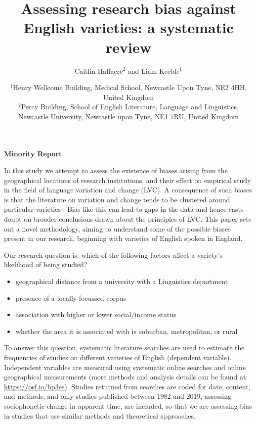 \documentclass[12pt,a4paper]{article}
\title{Assessing research bias against English varieties: a systematic review}
\author{Caitlin Halfacre$^{2}$ and Liam Keeble$^{1}$}
\date{$^{1}$Henry Wellcome Building, Medical School, Newcastle Upon Tyne, NE2 4HH, United Kingdom\\
$^{2}$Percy Building, School of English Literature, Language and Linguistics, Newcastle University, Newcastle upon Tyne, NE1 7RU, United Kingdom\\}
\newcommand{\todocontentinline}[1]{\todo[color=RoyalPurple,inline]{#1}}
\begin{document}
\begin{center}
	\textbf{Minority Report}\\
\end{center}

\todocontentinline{Current word count 256}

In this study we attempt to assess the existence of biases arising from the geographical locations of research institutions, and their effect on empirical study in the field of language variation and change (LVC).  
A consequence of such biases is that the literature on variation and change tends to be clustered around particular varieties \citep{Trudgill2002}. Bias like this can lead to gaps in the data and hence casts doubt on broader conclusions drawn about the principles of LVC. This paper sets out a novel methodology, aiming to understand some of the possible biases present in our research, beginning with varieties of English spoken in England. 
	
Our research question is: which of the following factors affect a variety's likelihood of being studied?
	\begin{itemize}
		\item geographical distance from a university with a Linguistics department
		\item presence of a locally focussed corpus
		\item association with higher or lower social/income status
		\item whether the area it is associated with is suburban, metropolitan, or rural
	\end{itemize}


To answer this question, systematic literature searches \citep{lefebvre2019searching} are used to estimate the frequencies of studies on different varieties of English (dependent variable). Independent variables are measured using systematic online searches and online geographical measurements (more methods and analysis details can be found at: \url{ https://osf.io/bp3es}). Studies returned from searches are coded for date, content, and methods, and only studies published between 1982 \citep{Wells1982b} and 2019, assessing sociophonetic change in apparent time, are included, so that we are assessing bias in studies that use similar methods and theoretical approaches.

\pagebreak

\end{document}
